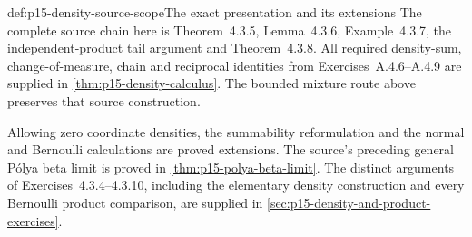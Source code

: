 \begin{proofboundary}{def:p15-density-source-scope}{The exact presentation and its extensions}
The complete source chain here is Theorem~4.3.5, Lemma~4.3.6,
Example~4.3.7, the independent-product tail argument and Theorem~4.3.8.
All required density-sum, change-of-measure, chain and reciprocal
identities from Exercises~A.4.6--A.4.9 are supplied in
\cref{thm:p15-density-calculus}. The bounded mixture route above
preserves that source construction.

Allowing zero coordinate densities, the summability reformulation
and the normal and Bernoulli calculations are proved extensions.
The source's preceding general P\'olya beta limit is proved in
\cref{thm:p15-polya-beta-limit}. The distinct arguments of
Exercises~4.3.4--4.3.10, including the elementary density construction
and every Bernoulli product comparison, are supplied in
\cref{sec:p15-density-and-product-exercises}.
\end{proofboundary}
